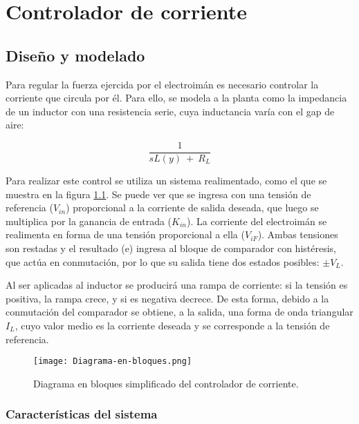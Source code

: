 \chapter{Controlador de corriente}  \label{cap:ControladorCorriente}
\section{Diseño y modelado}

\noindent Para regular la fuerza ejercida por el electroimán es necesario controlar la corriente que circula por él. Para ello, se modela a la planta como la impedancia de un inductor con una resistencia serie, cuya inductancia varía con el gap de aire:

\begin{equation} \label{eq_admitancia}
\frac{1}{sL(y)\ +\ R_L}
\end{equation}

\noindent Para realizar este control se utiliza un sistema realimentado, como el que se muestra en la figura \ref{fig:img_diag-en-bloques}. Se puede ver que se ingresa con una tensión de referencia ($V_{in}$) proporcional a la corriente de salida deseada, que luego se multiplica por la ganancia de entrada ($K_{in}$). La corriente del electroimán se realimenta en forma de una tensión proporcional a ella ($V_{iF}$). Ambas tensiones son restadas y el resultado (e) ingresa al bloque de comparador con histéresis, que actúa en conmutación, por lo que su salida tiene dos estados posibles: $\pm$$V_L$.

\noindent Al ser aplicadas al inductor se producirá una rampa de corriente: si la tensión es positiva, la rampa crece, y si es negativa decrece. De esta forma, debido a la conmutación del comparador se obtiene, a la salida, una forma de onda triangular $I_L$, cuyo valor medio es la corriente deseada y se corresponde a la tensión de referencia.

\begin{figure}[H]
	\centering
	\texttt{[image: Diagrama-en-bloques.png]}
	\caption{Diagrama en bloques simplificado del controlador de corriente.}
	\label{fig:img_diag-en-bloques}
\end{figure}

\subsection{Características del sistema}

